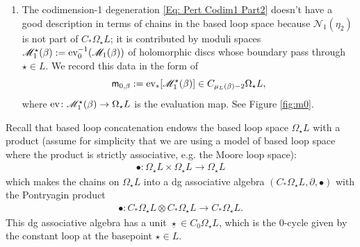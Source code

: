 \documentclass[10pt]{amsart}
\numberwithin{equation}{section}
\theoremstyle{plain}
\theoremstyle{definition}
\theoremstyle{remark}
\numberwithin{equation}{section}
\newcommand{\ev}{\textup{ev}}
\newcommand{\ms}[1]{\mathscr{#1}}
\newcommand{\mm}{\textup{\textsf{m}}}
\begin{document}
{\begin{enumerate}
\begin{align}
\begin{cases}
			\alpha(k_x)(2\tau-1), & \tau \in [\frac{s+1}{2}, 1]
		\end{cases}.
	\end{align}
	This is analogous to the pre-Lie product $*$ in section 3 of \cite{ChasSullivan}. See Figure \ref{fig:m1}.
	\item The codimension-1 degeneration \eqref{Eq: Pert Codim1 Part2} doesn't have a good description in terms of chains in the based loop space because $\ms{N}_1(\eta_2)$ is not part of $C_*\Omega_\star L$; it is contributed by moduli spaces $\ms{M}_1^\star(\beta):= \ev_0^{-1}(\ms{M}_1(\beta))$ of holomorphic discs whose boundary pass through $\star\in L$. We record this data in the form of \[  \mm_{0,\beta}:= \ev_*[\ms{M}_1^\star(\beta)]\in C_{\mu_L(\beta)-2}\Omega_\star L, \] where $\ev\colon \ms{M}_1^\star(\beta)\to \Omega_\star L$ is the evaluation map. See Figure \ref{fig:m0}. 
\end{enumerate}


Recall that based loop concatenation endows the based loop space $\Omega_\star L$  with a product (assume for simplicity that we are using a model of based loop space where the product is strictly associative, e.g. the Moore loop space):
\begin{align*}
	\bullet\colon \Omega_\star L\times \Omega_\star L\to \Omega_\star L
\end{align*}
which makes the chains on $\Omega_\star L$ into a dg associative algebra $(C_*\Omega_\star L, \partial, \bullet)$ with the Pontryagin product \begin{align*}
	\bullet \colon C_*\Omega_\star L\otimes C_*\Omega_\star L\to C_*\Omega_\star L.
\end{align*}
This dg associative algebra has a unit $\underline{\star}\in C_0\Omega_\star L$, which is the 0-cycle given by the constant loop at the basepoint $\star\in L$.

}
\end{document}
